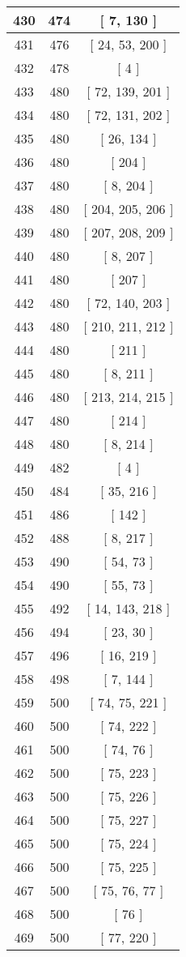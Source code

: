 \begin{center}
\begin{longtable}[H]{|| c c c ||}
\hline
430 & 474 & [ 7, 130 ] \\ 
\hline
431 & 476 & [ 24, 53, 200 ] \\ 
\hline
432 & 478 & [ 4 ] \\ 
\hline
433 & 480 & [ 72, 139, 201 ] \\ 
\hline
434 & 480 & [ 72, 131, 202 ] \\ 
\hline
435 & 480 & [ 26, 134 ] \\ 
\hline
436 & 480 & [ 204 ] \\ 
\hline
437 & 480 & [ 8, 204 ] \\ 
\hline
438 & 480 & [ 204, 205, 206 ] \\ 
\hline
439 & 480 & [ 207, 208, 209 ] \\ 
\hline
440 & 480 & [ 8, 207 ] \\ 
\hline
441 & 480 & [ 207 ] \\ 
\hline
442 & 480 & [ 72, 140, 203 ] \\ 
\hline
443 & 480 & [ 210, 211, 212 ] \\ 
\hline
444 & 480 & [ 211 ] \\ 
\hline
445 & 480 & [ 8, 211 ] \\ 
\hline
446 & 480 & [ 213, 214, 215 ] \\ 
\hline
447 & 480 & [ 214 ] \\ 
\hline
448 & 480 & [ 8, 214 ] \\ 
\hline
449 & 482 & [ 4 ] \\ 
\hline
450 & 484 & [ 35, 216 ] \\ 
\hline
451 & 486 & [ 142 ] \\ 
\hline
452 & 488 & [ 8, 217 ] \\ 
\hline
453 & 490 & [ 54, 73 ] \\ 
\hline
454 & 490 & [ 55, 73 ] \\ 
\hline
455 & 492 & [ 14, 143, 218 ] \\ 
\hline
456 & 494 & [ 23, 30 ] \\ 
\hline
457 & 496 & [ 16, 219 ] \\ 
\hline
458 & 498 & [ 7, 144 ] \\ 
\hline
459 & 500 & [ 74, 75, 221 ] \\ 
\hline
460 & 500 & [ 74, 222 ] \\ 
\hline
461 & 500 & [ 74, 76 ] \\ 
\hline
462 & 500 & [ 75, 223 ] \\ 
\hline
463 & 500 & [ 75, 226 ] \\ 
\hline
464 & 500 & [ 75, 227 ] \\ 
\hline
465 & 500 & [ 75, 224 ] \\ 
\hline
466 & 500 & [ 75, 225 ] \\ 
\hline
467 & 500 & [ 75, 76, 77 ] \\ 
\hline
468 & 500 & [ 76 ] \\ 
\hline
469 & 500 & [ 77, 220 ] \\ 
\hline
\end{longtable}
\end{center}
